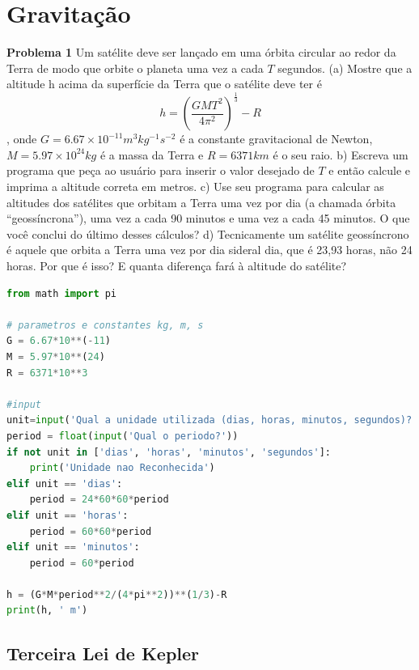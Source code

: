 \chapter{Gravitação}


{\bf Problema 1} Um satélite deve ser lançado em uma órbita circular ao redor da Terra de modo que orbite o planeta uma vez a cada $T$ segundos.
(a) Mostre que a altitude h acima da superfície da Terra que o satélite deve ter é
$$h = \left( \frac{GMT^2}{4\pi^2}\right)^{\frac{1}{3}} - R$$,
onde $G = 6.67 \times 10^{-11} m^3 kg^{-1}s^{-2}$ é a constante gravitacional de Newton, $M = 5.97 \times 10^{24} kg$ é a massa da Terra e $R = 6371 km$ é o seu raio.
b) Escreva um programa que peça ao usuário para inserir o valor desejado de $T$ e então calcule e imprima a altitude correta em metros.
c) Use seu programa para calcular as altitudes dos satélites que orbitam a Terra uma vez
por dia (a chamada órbita ``geossíncrona''), uma vez a cada 90 minutos e uma vez a cada
45 minutos. O que você conclui do último desses cálculos?
d) Tecnicamente um satélite geossíncrono é aquele que orbita a Terra uma vez por dia sideral dia, que é 23,93 horas, não 24 horas. Por que é isso? E quanta diferença
fará à altitude do satélite?

\begin{lstlisting}[language=Python, frame=lines,basicstyle=\footnotesize, caption={Altitude de um Satélite}, label={lst:Satelite}]
from math import pi

# parametros e constantes kg, m, s
G = 6.67*10**(-11) 
M = 5.97*10**(24) 
R = 6371*10**3

#input
unit=input('Qual a unidade utilizada (dias, horas, minutos, segundos)?')
period = float(input('Qual o periodo?'))
if not unit in ['dias', 'horas', 'minutos', 'segundos']:
    print('Unidade nao Reconhecida')
elif unit == 'dias':
    period = 24*60*60*period
elif unit == 'horas':
    period = 60*60*period
elif unit == 'minutos':
    period = 60*period

h = (G*M*period**2/(4*pi**2))**(1/3)-R
print(h, ' m')
\end{lstlisting}


\section{Terceira Lei de Kepler}

